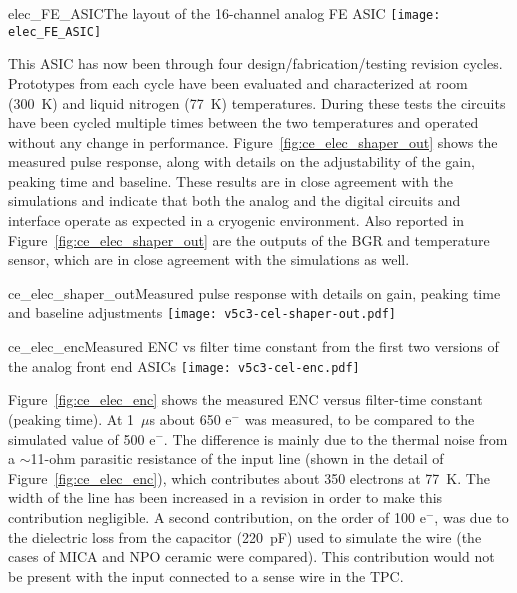 \begin{cdrfigure}{elec_FE_ASIC}{The layout of the 16-channel analog FE ASIC}
\texttt{[image: elec\_FE\_ASIC]} %
\end{cdrfigure}

This ASIC has now been through four design/fabrication/testing revision cycles.
Prototypes from each cycle have been evaluated and characterized at room (300~K) and liquid nitrogen (77~K) temperatures.
During these tests the circuits have been cycled multiple times
between the two temperatures and operated without any change in performance.
Figure~\ref{fig:ce_elec_shaper_out} shows the measured pulse response, along with
details on the adjustability of the gain, peaking time and baseline.
These results are in close agreement with the simulations and indicate
that both the analog and the digital circuits and interface operate as
expected in a cryogenic environment.
Also reported in Figure~\ref{fig:ce_elec_shaper_out} are the outputs of the BGR and temperature sensor,
which are in close agreement with the simulations as well.

\begin{cdrfigure}{ce_elec_shaper_out}{Measured pulse response with details on gain, peaking time and baseline adjustments}
\texttt{[image: v5c3-cel-shaper-out.pdf]}
\end{cdrfigure}

\begin{cdrfigure}{ce_elec_enc}{Measured ENC vs filter time constant from the first two versions of the analog front end ASICs}
\texttt{[image: v5c3-cel-enc.pdf]}
\end{cdrfigure}

Figure~\ref{fig:ce_elec_enc} shows the measured ENC versus filter-time constant (peaking time).
At 1~$\mu$s about 650 e$^{-}$ was measured, to be compared to the simulated value of 500 e$^{-}$.
The difference is mainly due to the thermal noise from a $\sim$11-ohm parasitic resistance of the input
line (shown in the detail of Figure~\ref{fig:ce_elec_enc}), which contributes about 350 electrons at 77~K.
The width of the line has been increased in a revision in order to make this contribution negligible.
A second contribution, on the order of 100 e$^{-}$,
was due to the dielectric loss from the capacitor (220~pF) used to simulate the wire
(the cases of MICA and NPO ceramic were compared).
This contribution would not be present with the input connected to a sense wire in the TPC.

